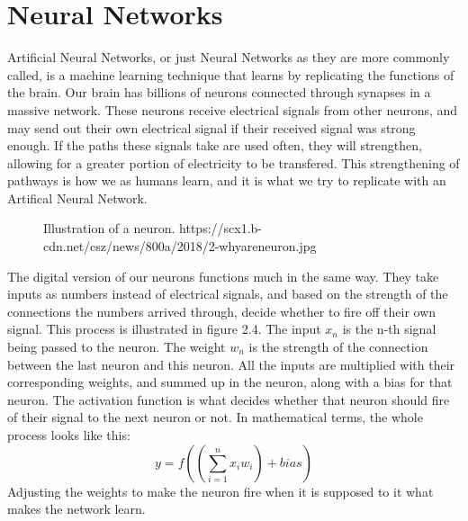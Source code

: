 \section{Neural Networks}\label{sec:neural networks}
Artificial Neural Networks, or just Neural Networks as they are more commonly called, is a machine learning technique that learns by replicating the functions of the brain.
Our brain has billions of neurons connected through synapses in a massive network.
These neurons receive electrical signals from other neurons, and may send out their own electrical signal if their received signal was strong enough.
If the paths these signals take are used often, they will strengthen, allowing for a greater portion of electricity to be transfered.
This strengthening of pathways is how we as humans learn, and it is what we try to replicate with an Artifical Neural Network.
\begin{figure}[h]
    \caption{Illustration of a neuron. https://scx1.b-cdn.net/csz/news/800a/2018/2-whyareneuron.jpg}
    \label{fig:figure2.3}
\end{figure}

The digital version of our neurons functions much in the same way.
They take inputs as numbers instead of electrical signals, and based on the strength of the connections the numbers arrived through, decide whether to fire off their own signal.
This process is illustrated in figure 2.4.
The input $x_n$ is the n-th signal being passed to the neuron.
The weight $w_n$ is the strength of the connection between the last neuron and this neuron.
All the inputs are multiplied with their corresponding weights, and summed up in the neuron, along with a bias for that neuron.
The activation function is what decides whether that neuron should fire of their signal to the next neuron or not.
In mathematical terms, the whole process looks like this: \[y = f(\left(\sum_{i=1}^{n} x_i w_i\right) + bias)\]
Adjusting the weights to make the neuron fire when it is supposed to it what makes the network learn.

